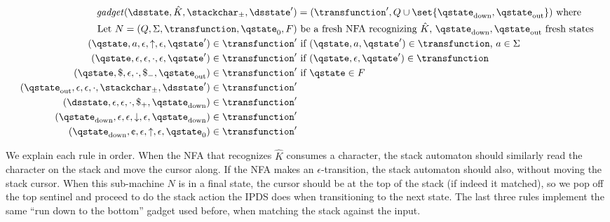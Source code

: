 \begin{align*}
\gadget(\dsstate, \hat K, \stackchar_\pm, \dsstate') &= (\transfunction', Q \cup \set{\qstate_{\text{down}}, \qstate_{\text{out}}})\text{ where} \\
 \text{Let } N = (Q, \Sigma, \transfunction, \qstate_0, F) &\text{ be a fresh NFA recognizing } \hat K
 \text{, } \qstate_{\text{down}}, \qstate_{\text{out}} \text{ fresh states}
 \\ (\qstate, a, \epsilon, \uparrow, \epsilon, \qstate') \in \transfunction' &\text{ if } (\qstate, a, \qstate') \in \transfunction \text{, } a \in \Sigma
 \\ (\qstate, \epsilon, \epsilon, \cdot, \epsilon, \qstate') \in \transfunction' &\text{ if } (\qstate, \epsilon, \qstate') \in \transfunction
 \\ (\qstate, \$, \epsilon, \cdot, \$_-, \qstate_{\text{out}}) \in \transfunction' &\text{ if } \qstate \in F
 \\ (\qstate_{\text{out}}, \epsilon, \epsilon, \cdot, \stackchar_\pm, \dsstate') \in \transfunction'
 \\ (\dsstate, \epsilon, \epsilon, \cdot, \$_+, \qstate_{\text{down}}) \in \transfunction'
 \\ (\qstate_{\text{down}}, \epsilon, \epsilon, \downarrow, \epsilon, \qstate_{\text{down}}) \in \transfunction'
 \\ (\qstate_{\text{down}}, \text\textcent, \epsilon, \uparrow, \epsilon, \qstate_0) \in \transfunction'
\end{align*}

We explain each rule in order.
When the NFA that recognizes $\hat K$ consumes a character, the stack automaton should similarly read the character on the stack and move the cursor along.
If the NFA makes an $\epsilon$-transition, the stack automaton should also, without moving the stack cursor.
When this sub-machine $N$ is in a final state, the cursor should be at the top of the stack (if indeed it matched), so we pop off the top sentinel and proceed to do the stack action the IPDS does when transitioning to the next state.
The last three rules implement the same ``run down to the bottom'' gadget used before, when matching the stack against the input.

